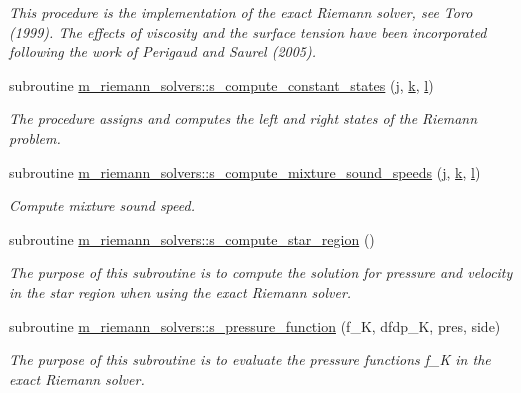 \begin{DoxyCompactItemize}
\begin{DoxyCompactList}\small\item\em This procedure is the implementation of the exact Riemann solver, see Toro (1999). The effects of viscosity and the surface tension have been incorporated following the work of Perigaud and Saurel (2005). \end{DoxyCompactList}\item 
subroutine \hyperlink{namespacem__riemann__solvers_a16383eccdd2d0ecca7d1c26467daaaab}{m\+\_\+riemann\+\_\+solvers\+::s\+\_\+compute\+\_\+constant\+\_\+states} (\hyperlink{m__rhs_8f90_aeadbc0ce9b66517f8fde156199772ec1}{j}, \hyperlink{m__rhs_8f90_af22c486581933c52df7d4aa306382074}{k}, \hyperlink{m__rhs_8f90_a2ac747380de0e6e5e11b01f4137fb75c}{l})
\begin{DoxyCompactList}\small\item\em The procedure assigns and computes the left and right states of the Riemann problem. \end{DoxyCompactList}\item 
subroutine \hyperlink{namespacem__riemann__solvers_a16d6f8f4c3ad64fdb574a50c189750c5}{m\+\_\+riemann\+\_\+solvers\+::s\+\_\+compute\+\_\+mixture\+\_\+sound\+\_\+speeds} (\hyperlink{m__rhs_8f90_aeadbc0ce9b66517f8fde156199772ec1}{j}, \hyperlink{m__rhs_8f90_af22c486581933c52df7d4aa306382074}{k}, \hyperlink{m__rhs_8f90_a2ac747380de0e6e5e11b01f4137fb75c}{l})
\begin{DoxyCompactList}\small\item\em Compute mixture sound speed. \end{DoxyCompactList}\item 
subroutine \hyperlink{namespacem__riemann__solvers_a947bc1c7da743ee0820ff6648fef3c25}{m\+\_\+riemann\+\_\+solvers\+::s\+\_\+compute\+\_\+star\+\_\+region} ()
\begin{DoxyCompactList}\small\item\em The purpose of this subroutine is to compute the solution for pressure and velocity in the star region when using the exact Riemann solver. \end{DoxyCompactList}\item 
subroutine \hyperlink{namespacem__riemann__solvers_aba768ee53f47327a70508a913b55254d}{m\+\_\+riemann\+\_\+solvers\+::s\+\_\+pressure\+\_\+function} (f\+\_\+K, dfdp\+\_\+K, pres, side)
\begin{DoxyCompactList}\small\item\em The purpose of this subroutine is to evaluate the pressure functions f\+\_\+K in the exact Riemann solver. \end{DoxyCompactList}\item 

\end{DoxyCompactItemize}
